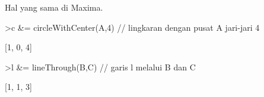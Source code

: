 \documentclass[12pt,arial,letterpaper]{book}
\begin{document}
\begin{eulercomment}
\begin{eulercomment}
\begin{eulercomment}
\begin{eulercomment}
\begin{eulercomment}
\begin{eulercomment}
\begin{eulercomment}
\begin{eulercomment}
\begin{eulercomment}
\begin{eulercomment}
\begin{eulercomment}
\begin{eulercomment}
\begin{eulercomment}
\begin{eulercomment}
\begin{eulercomment}
\begin{eulercomment}
\begin{eulercomment}
\begin{eulercomment}
\begin{eulercomment}
\begin{eulercomment}
\begin{eulercomment}
\begin{eulercomment}
\begin{eulercomment}
\begin{eulercomment}
\begin{eulercomment}
\begin{eulercomment}
\begin{eulercomment}
Hal yang sama di Maxima.
\end{eulercomment}
\begin{eulerprompt}
>c &= circleWithCenter(A,4) // lingkaran dengan pusat A jari-jari 4
\end{eulerprompt}
\begin{euleroutput}
  
                                [1, 0, 4]
  
\end{euleroutput}
\begin{eulerprompt}
>l &= lineThrough(B,C) // garis l melalui B dan C
\end{eulerprompt}
\begin{euleroutput}
  
                                [1, 1, 3]
  

\end{euleroutput}
\end{eulercomment}
\end{eulercomment}
\end{eulercomment}
\end{eulercomment}
\end{eulercomment}
\end{eulercomment}
\end{eulercomment}
\end{eulercomment}
\end{eulercomment}
\end{eulercomment}
\end{eulercomment}
\end{eulercomment}
\end{eulercomment}
\end{eulercomment}
\end{eulercomment}
\end{eulercomment}
\end{eulercomment}
\end{eulercomment}
\end{eulercomment}
\end{eulercomment}
\end{eulercomment}
\end{eulercomment}
\end{eulercomment}
\end{eulercomment}
\end{eulercomment}
\end{eulercomment}
\end{document}
